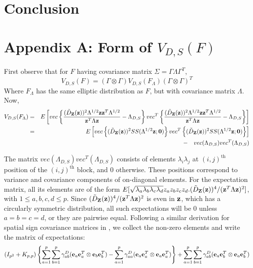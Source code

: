 \documentclass[fleqn,12pt]{article}
\begin{document}
\section{Conclusion}

\newpage
\section*{Appendix A: \textbf{Form of $V_{D,S}(F)$}}
First observe that for $F$ having covariance matrix $\Sigma = \Gamma\Lambda\Gamma^T$,
$$ V_{D,S}(F)  = (\Gamma \otimes \Gamma) V_{D,S}(F_\Lambda) (\Gamma \otimes \Gamma)^T$$
Where $F_\Lambda$ has the same elliptic distribution as $F$, but with covariance matrix $\Lambda$. Now,
\begin{eqnarray*}
V_{D,S} (F_\Lambda) &=& E \left[ vec \left\{ \frac{(\tilde D_{\mathbf{Z}} ({\bf{z}}))^2 \Lambda^{1/2} {\bf{z}}{\bf{z}}^T \Lambda^{1/2}}{{\bf{z}}^T\Lambda{\bf{z}}} - \Lambda_{D,S} \right\} vec^T \left\{ \frac{(\tilde D_{\mathbf{Z}} ({\bf{z}}))^2 \Lambda^{1/2} {\bf{z}}{\bf{z}}^T \Lambda^{1/2}}{{\bf{z}}^T\Lambda{\bf{z}}} - \Lambda_{D,S} \right\} \right]\\
&=& E \left[ vec \left\{ (\tilde D_{\mathbf{Z}} ({\bf{z}}))^2 SS(\Lambda^{1/2}{\bf{z}}; \bf0) \right\} vec^T \left\{ (\tilde D_{\mathbf{Z}} ({\bf{z}}))^2 SS(\Lambda^{1/2}{\bf{z}}; \bf0) \right\} \right]\\
&& - \quad vec(\Lambda_{D,S}) vec^T(\Lambda_{D,S})
\end{eqnarray*}

The matrix $vec(\Lambda_{D,S}) vec^T(\Lambda_{D,S})$ consists of elements $\lambda_i\lambda_j$ at $(i,j)^\text{th}$ position of the $(i,j)^\text{th}$ block, and 0 otherwise. These positions correspond to variance and covariance components of on-diagonal elements. For the expectation matrix, all its elements are of the form $E[\sqrt{\lambda_a \lambda_b \lambda_c \lambda_d} z_a z_b z_c z_d . (\tilde D_{\mathbf{Z}} ({\bf{z}}))^4 / ({\bf{z}}^T \Lambda {\bf{z}})^2]$, with $1 \leq a,b,c,d \leq p$. Since $(\tilde D_{\mathbf{Z}} ({\bf{z}}))^4 / ({\bf{z}}^T \Lambda {\bf{z}})^2$ is even in ${\bf{z}}$, which has a circularly symmetric distribution, all such expectations will be 0 unless $a=b=c=d$, or they are pairwise equal. Following a similar derivation for spatial sign covariance matrices in \cite{magyar14}, we collect the non-zero elements and write the matrix of expectations:
$$ (I_{p^2} + K_{p,p}) \left\{ \sum_{a=1}^p \sum_{b=1}^p \gamma^D_{ab} ({\bf{e}}_a {\bf{e}}_a^T \otimes  {\bf{e}}_b {\bf{e}}_b^T) - \sum_{a=1}^p \gamma^D_{aa} ({\bf{e}}_a {\bf{e}}_a^T \otimes  {\bf{e}}_a {\bf{e}}_a^T) \right\} + \sum_{a=1}^p \sum_{b=1}^p \gamma^D_{ab} ({\bf{e}}_a {\bf{e}}_b^T \otimes  {\bf{e}}_a {\bf{e}}_b^T) $$
\end{document}
